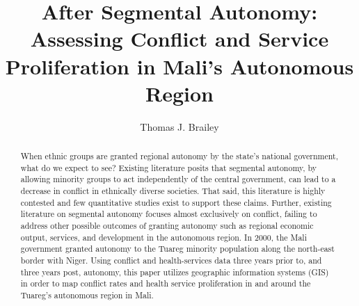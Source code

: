 \documentclass[12pt]{article}
\title{After Segmental Autonomy: Assessing Conflict and Service Proliferation in Mali's Autonomous Region}
\author{Thomas J. Brailey}
\begin{document}
\maketitle

\doublespacing










\begin{abstract}
When ethnic groups are granted regional autonomy by the state’s national government, what do we expect to see? Existing literature posits that segmental autonomy, by allowing minority groups to act independently of the central government, can lead to a decrease in conflict in ethnically diverse societies. That said, this literature is highly contested and few quantitative studies exist to support these claims. Further, existing literature on segmental autonomy focuses almost exclusively on conflict, failing to address other possible outcomes of granting autonomy such as regional economic output, services, and development in the autonomous region. In 2000, the Mali government granted autonomy to the Tuareg minority population along the north-east border with Niger. Using conflict and health-services data three years prior to, and three years post, autonomy, this paper utilizes geographic information systems (GIS) in order to map conflict rates and health service proliferation in and around the Tuareg's autonomous region in Mali. 
\end{abstract}
\end{document}
